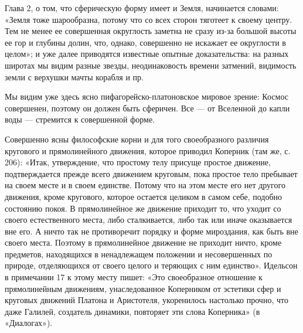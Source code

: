 Глава  2, о  том,  что  сферическую форму  имеет  и Земля,  начинается
словами: «Земля тоже шарообразна, потому что со всех сторон тяготеет к
своему центру. Тем не менее ее совершенная округлость заметна не сразу
из-за большой высоты  ее гор и глубины долин,  что, однако, совершенно
не искажает ее  округлости в целом»; и уже  далее приводятся известные
опытные  доказательства: на  разных  широтах мы  видим разные  звезды,
неодинаковость  времени затмений,  видимость  земли  с верхушки  мачты
корабля и пр.

Мы  видим уже  здесь  ясно  пифагорейско-платоновское мировое  зрение:
Космос  совершенен,  поэтому  он  должен быть  сферичен.  Все  ---  от
Вселенной до капли воды --- стремится к совершенной форме.

Совершенно ясны  философские корни  и для того  своеобразного различия
кругового и  прямолинейного движения,  которое приводил  Коперник (там
же, с.  206): «Итак,  утверждение, что  простому телу  присуще простое
движение, подтверждается прежде всего движением круговым, пока простое
тело пребывает на  своем месте и в своем единстве.  Потому что на этом
месте  его нет  другого  движения, кроме  кругового, которое  остается
целиком  в самом  себе, подобно  состоянию покоя.  В прямолинейное  же
движение приходит то,  что уходит со своего  естественного места, либо
сталкивается, либо так  или иначе оказывается вне его. А  ничто так не
противоречит порядку  и форме мироздания,  как быть вне  своего места.
Поэтому в  прямолинейное движение не приходит  ничто, кроме предметов,
находящихся  в  ненадлежащем  положении и  несовершенных  по  природе,
отделяющихся от своего  целого и теряющих с ним  единство». Идельсон в
примечании  17 к  этому  месту пишет:  «Это  своеобразное отношение  к
прямолинейным движениям, унаследованное Коперником  от эстетики сфер и
круговых движений Платона и  Аристотеля, укоренилось настолько прочно,
что даже  Галилей, создатель динамики, повторяет  эти слова Коперника»
(в «Диалогах»).

